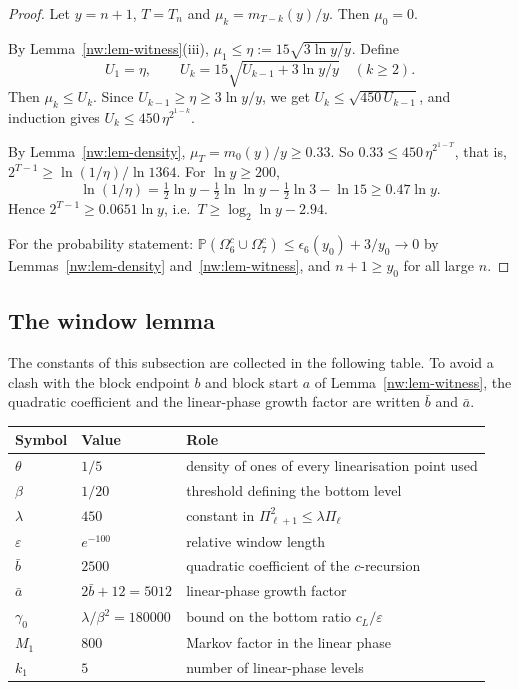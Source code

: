 \documentclass[11pt]{amsart}
\theoremstyle{definition}
\theoremstyle{remark}
\newcommand{\eps}{\varepsilon}
\newcommand{\PP}{\mathbb{P}}
\begin{document}
\begin{proof}
Let $y=n+1$, $T=T_n$ and $\mu_k=m_{T-k}(y)/y$. Then $\mu_0=0$.

By Lemma~\ref{nw:lem-witness}(iii), $\mu_1\le\eta:=15\sqrt{3\ln y/y}$.
Define
\[
  U_1=\eta,\qquad U_k=15\sqrt{U_{k-1}+3\ln y/y}\quad(k\ge2).
\]
Then $\mu_k\le U_k$. Since $U_{k-1}\ge\eta\ge3\ln y/y$, we get
$U_k\le\sqrt{450\,U_{k-1}}$, and induction gives
$U_k\le450\,\eta^{2^{1-k}}$.

By Lemma~\ref{nw:lem-density}, $\mu_T=m_0(y)/y\ge0.33$. So
$0.33\le450\,\eta^{2^{1-T}}$, that is, $2^{T-1}\ge\ln(1/\eta)/\ln1364$. For
$\ln y\ge200$,
\[
  \ln(1/\eta)=\tfrac12\ln y-\tfrac12\ln\ln y-\tfrac12\ln3-\ln15\ge0.47\ln y.
\]
Hence $2^{T-1}\ge0.0651\ln y$, i.e.\ $T\ge\log_2\ln y-2.94$.

For the probability statement: $\PP(\Omega_6^c\cup\Omega_7^c)\le
\epsilon_6(y_0)+3/y_0\to0$ by Lemmas~\ref{nw:lem-density}
and~\ref{nw:lem-witness}, and $n+1\ge y_0$ for all large $n$.
\end{proof}

\subsection{The window lemma}\label{nw:sec-window}

The constants of this subsection are collected in the following table. To
avoid a clash with the block endpoint $b$ and block start $a$ of
Lemma~\ref{nw:lem-witness}, the quadratic coefficient and the linear-phase
growth factor are written $\bar b$ and $\bar a$.

\begin{center}
\small
\begin{tabular}{@{}lll@{}}
\toprule
Symbol & Value & Role\\
\midrule
$\theta$ & $1/5$ & density of ones of every linearisation point used\\
$\beta$ & $1/20$ & threshold defining the bottom level\\
$\lambda$ & $450$ & constant in $\Pi_{\ell+1}^2\le\lambda\Pi_\ell$\\
$\eps$ & $e^{-100}$ & relative window length\\
$\bar b$ & $2500$ & quadratic coefficient of the $c$-recursion\\
$\bar a$ & $2\bar b+12=5012$ & linear-phase growth factor\\
$\gamma_0$ & $\lambda/\beta^2=180000$ & bound on the bottom ratio $c_L/\eps$\\
$M_1$ & $800$ & Markov factor in the linear phase\\
$k_1$ & $5$ & number of linear-phase levels\\
\bottomrule
\end{tabular}
\end{center}
\end{document}
